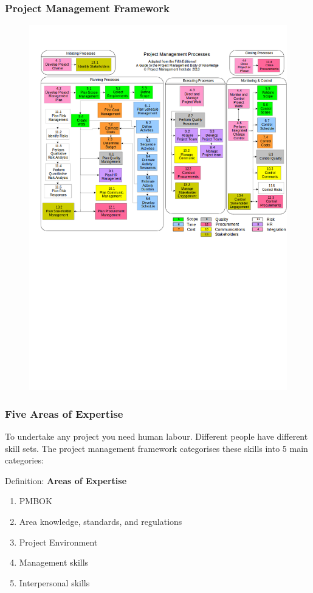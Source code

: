 \documentclass{beamer}
\begin{document}
\begin{frame}
\frametitle{Project Management Framework}
\begin{figure}
\includegraphics[scale=0.3]{mapping}
\end{figure}
\end{frame}

\begin{frame}
\frametitle{Five Areas of Expertise}
To undertake any project you need human labour. Different people have different skill sets. The project management framework categorises these skills into 5 main categories:
\vspace{0.5cm}
\begin{block}{Definition: \textbf{Areas of Expertise}}
\begin{enumerate}
\item PMBOK
\item Area knowledge, standards, and regulations
\item Project Environment
\item Management skills
\item Interpersonal skills
\end{enumerate}
\end{block}
\end{frame}
\end{document}

